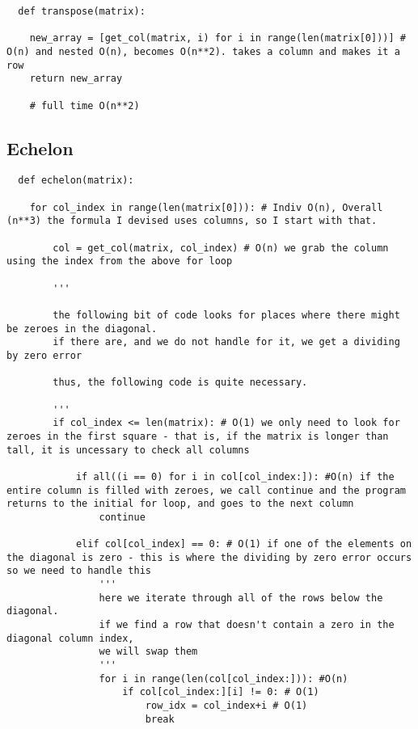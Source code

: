\documentclass[12pt, a4paper]{article}
\begin{document}
\begin{lstlisting}
  def transpose(matrix):

    new_array = [get_col(matrix, i) for i in range(len(matrix[0]))] # O(n) and nested O(n), becomes O(n**2). takes a column and makes it a row
    return new_array

    # full time O(n**2)
\end{lstlisting}

\subsection{Echelon}

\begin{lstlisting}
  def echelon(matrix): 
    
    for col_index in range(len(matrix[0])): # Indiv O(n), Overall (n**3) the formula I devised uses columns, so I start with that. 
        
        col = get_col(matrix, col_index) # O(n) we grab the column using the index from the above for loop

        '''
        
        the following bit of code looks for places where there might be zeroes in the diagonal.
        if there are, and we do not handle for it, we get a dividing by zero error

        thus, the following code is quite necessary.  
        
        '''
        if col_index <= len(matrix): # O(1) we only need to look for zeroes in the first square - that is, if the matrix is longer than tall, it is uncessary to check all columns

            if all((i == 0) for i in col[col_index:]): #O(n) if the entire column is filled with zeroes, we call continue and the program returns to the initial for loop, and goes to the next column
                continue 
            
            elif col[col_index] == 0: # O(1) if one of the elements on the diagonal is zero - this is where the dividing by zero error occurs so we need to handle this
                ''' 
                here we iterate through all of the rows below the diagonal. 
                if we find a row that doesn't contain a zero in the diagonal column index, 
                we will swap them
                '''
                for i in range(len(col[col_index:])): #O(n) 
                    if col[col_index:][i] != 0: # O(1)
                        row_idx = col_index+i # O(1)
                        break 
                

\end{lstlisting}
\end{document}
